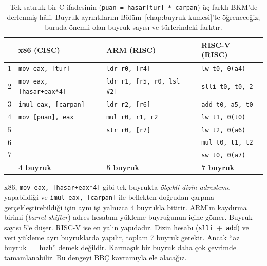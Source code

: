 \begin{table}[H]
\centering
\caption[Aynı C kodunun üç farklı BKM'de derlenmesi]{Tek satırlık bir C ifadesinin (\texttt{puan = hasar[tur] * carpan}) üç farklı BKM'de derlenmiş hâli. Buyruk ayrıntılarını Bölüm~\ref{chap:buyruk-kumesi}'te öğreneceğiz; burada önemli olan buyruk sayısı ve türlerindeki farktır.}
\label{tab:buyruk-karsilastirma}
\small
\begin{tabular}{@{}c@{\quad}l@{\qquad}l@{\qquad}l@{}}
\toprule
 & \textbf{x86 (CISC)} & \textbf{ARM (RISC)} & \textbf{RISC-V (RISC)} \\
\midrule
1 & \texttt{mov eax, [tur]}          & \texttt{ldr r0, [r4]}             & \texttt{lw t0, 0(a4)} \\
2 & \texttt{mov eax, [hasar+eax*4]}  & \texttt{ldr r1, [r5, r0, lsl \#2]} & \texttt{slli t0, t0, 2} \\
3 & \texttt{imul eax, [carpan]}      & \texttt{ldr r2, [r6]}             & \texttt{add t0, a5, t0} \\
4 & \texttt{mov [puan], eax}         & \texttt{mul r0, r1, r2}           & \texttt{lw t1, 0(t0)} \\
5 &                                  & \texttt{str r0, [r7]}             & \texttt{lw t2, 0(a6)} \\
6 &                                  &                                   & \texttt{mul t0, t1, t2} \\
7 &                                  &                                   & \texttt{sw t0, 0(a7)} \\
\midrule
  & \textbf{4 buyruk}                & \textbf{5 buyruk}                 & \textbf{7 buyruk} \\
\bottomrule
\end{tabular}
\end{table}

x86, \texttt{mov eax, [hasar+eax*4]} gibi tek buyrukta \emph{ölçekli dizin adresleme} yapabildiği ve \texttt{imul eax, [carpan]} ile bellekten doğrudan çarpma gerçekleştirebildiği için aynı işi yalnızca 4 buyrukla bitirir. ARM'ın kaydırma birimi (\emph{barrel shifter}) adres hesabını yükleme buyruğunun içine gömer. Buyruk sayısı 5'e düşer. RISC-V ise en yalın yapıdadır. Dizin hesabı (\texttt{slli}~+~\texttt{add}) ve veri yükleme ayrı buyruklarda yapılır, toplam 7 buyruk gerekir. Ancak ``az buyruk~=~hızlı'' demek değildir. Karmaşık bir buyruk daha çok çevrimde tamamlanabilir. Bu dengeyi BBÇ kavramıyla ele alacağız.

